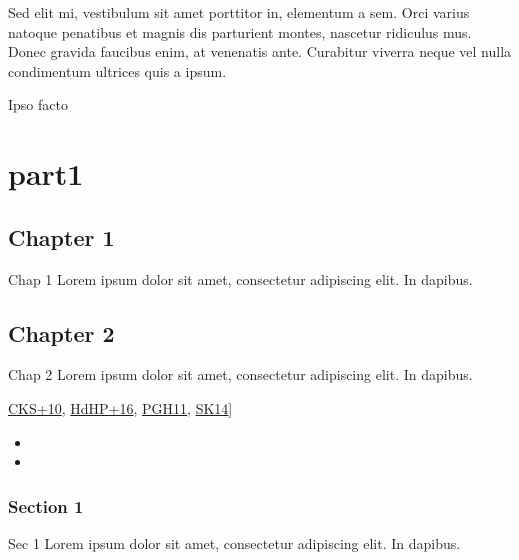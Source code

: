 \sphinxAtStartPar
Sed elit mi, vestibulum sit amet porttitor in, elementum a sem. Orci varius natoque penatibus et magnis dis parturient montes, nascetur ridiculus mus. Donec gravida faucibus enim, at venenatis ante. Curabitur viverra neque vel nulla condimentum ultrices quis a ipsum.

\begin{DUlineblock}{0em}
\item[] 
\end{DUlineblock}

\sphinxAtStartPar
Ipso facto


\part{part1}


\chapter{Chapter 1}
\label{\detokenize{part1/chap1:chapter-1}}\label{\detokenize{part1/chap1::doc}}
\sphinxAtStartPar
Chap 1 Lorem ipsum dolor sit amet, consectetur adipiscing elit. In dapibus.


\chapter{Chapter 2}
\label{\detokenize{part1/chap2:chapter-2}}\label{\detokenize{part1/chap2::doc}}
\sphinxAtStartPar
Chap 2 Lorem ipsum dolor sit amet, consectetur adipiscing elit. In dapibus.

\sphinxAtStartPar


\sphinxAtStartPar{[}\hyperlink{cite.part1/chap2:id5}{CKS+10}, \hyperlink{cite.part1/chap2:id3}{HdHP+16}, \hyperlink{cite.part1/chap2:id2}{PGH11}, \hyperlink{cite.part1/chap2:id4}{SK14}{]}
\begin{itemize}
\item{} 

\item{} 

\end{itemize}


\section{Section 1}
\label{\detokenize{part1/sec1:section-1}}\label{\detokenize{part1/sec1::doc}}
\sphinxAtStartPar
Sec 1 Lorem ipsum dolor sit amet, consectetur adipiscing elit. In dapibus.


